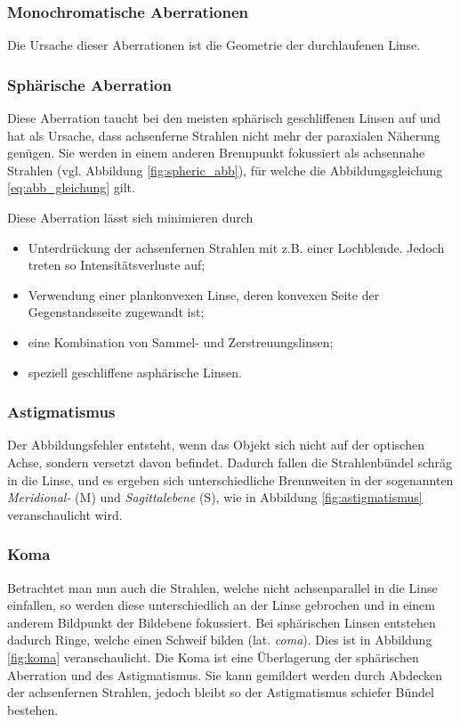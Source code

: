 \subsubsection{Monochromatische Aberrationen}
Die Ursache dieser Aberrationen ist die Geometrie der durchlaufenen Linse.

\subsubsection*{Sphärische Aberration}
Diese Aberration taucht bei den meisten sphärisch geschliffenen Linsen auf und hat als Ursache, dass achsenferne Strahlen nicht mehr der paraxialen Näherung genügen. Sie werden in einem anderen Brennpunkt fokussiert als achsennahe Strahlen (vgl. Abbildung \ref{fig:spheric_abb}), für welche die Abbildungsgleichung \eqref{eq:abb_gleichung} gilt.

Diese Aberration lässt sich minimieren durch
\begin{itemize}
	\item Unterdrückung der achsenfernen Strahlen mit z.B. einer Lochblende. Jedoch treten so Intensitätsverluste auf;
	\item Verwendung einer plankonvexen Linse, deren konvexen Seite der Gegenstandsseite zugewandt ist;
	\item eine Kombination von Sammel- und Zerstreuungslinsen;
	\item speziell geschliffene asphärische Linsen.
\end{itemize}

\subsubsection*{Astigmatismus}
Der Abbildungsfehler entsteht, wenn das Objekt sich nicht auf der optischen Achse, sondern versetzt davon befindet. Dadurch fallen die Strahlenbündel schräg in die Linse, und es ergeben sich unterschiedliche Brennweiten in der sogenannten \emph{Meridional-} (M) und \emph{Sagittalebene} (S), wie in Abbildung \ref{fig:astigmatismus} veranschaulicht wird.

\subsubsection*{Koma}
Betrachtet man nun auch die Strahlen, welche nicht achsenparallel in die Linse einfallen, so werden diese unterschiedlich an der Linse gebrochen und in einem anderem Bildpunkt der Bildebene fokussiert. Bei sphärischen Linsen entstehen dadurch Ringe, welche einen Schweif bilden (lat. \emph{coma}). Dies ist in Abbildung \ref{fig:koma} veranschaulicht. Die Koma ist eine Überlagerung der sphärischen Aberration und des Astigmatismus.
Sie kann gemildert werden durch Abdecken der achsenfernen Strahlen, jedoch bleibt so der Astigmatismus schiefer Bündel bestehen.

